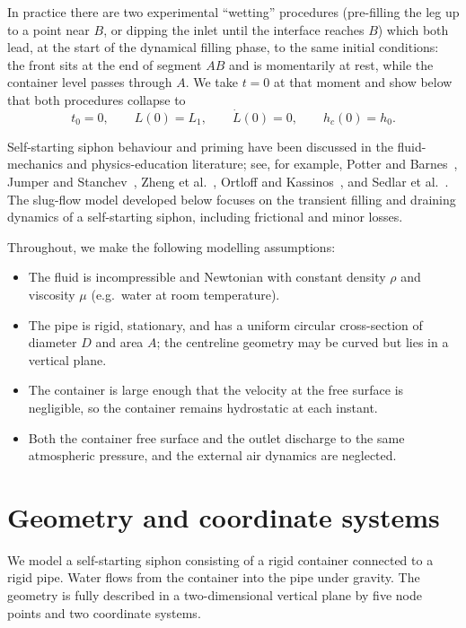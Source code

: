 \documentclass[11pt]{article}
\begin{document}
In practice there are two experimental ``wetting'' procedures (pre-filling the leg up to a point
near $B$, or dipping the inlet until the interface reaches $B$) which both lead, at the start
of the dynamical filling phase, to the same initial conditions: the front sits at the end of
segment $AB$ and is momentarily at rest, while the container level passes through $A$.
We take $t=0$ at that moment and show below that both procedures collapse to
\[
  t_0 = 0,\qquad L(0) = L_1,\qquad \dot L(0) = 0,\qquad h_c(0) = h_0.
\]

Self-starting siphon behaviour and priming have been discussed in the fluid-mechanics and
physics-education literature; see, for example, Potter and Barnes~\cite{potter_barnes}, Jumper and Stanchev~\cite{jumper_stanchev},
Zheng et al.~\cite{zheng_siphon}, Ortloff and Kassinos~\cite{ortloff_kassinos}, and Sedlar et al.~\cite{sedlar_siphon}.
The slug-flow model developed below focuses on the transient filling and draining dynamics
of a self-starting siphon, including frictional and minor losses.

Throughout, we make the following modelling assumptions:
\begin{itemize}
  \item The fluid is incompressible and Newtonian with constant density $\rho$ and viscosity
        $\mu$ (e.g.\ water at room temperature).
  \item The pipe is rigid, stationary, and has a uniform circular cross-section of diameter $D$
        and area $A$; the centreline geometry may be curved but lies in a vertical plane.
  \item The container is large enough that the velocity at the free surface is negligible, so the
        container remains hydrostatic at each instant.
  \item Both the container free surface and the outlet discharge to the same atmospheric pressure,
        and the external air dynamics are neglected.
\end{itemize}

\section{Geometry and coordinate systems}
\label{sec:geometry}

We model a self-starting siphon consisting of a rigid container connected to a rigid pipe.
Water flows from the container into the pipe under gravity. The geometry is fully described
in a two-dimensional vertical plane by five node points and two coordinate systems.
\end{document}
